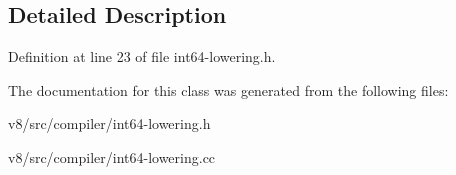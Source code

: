 \subsection{Detailed Description}


Definition at line 23 of file int64-\/lowering.\+h.



The documentation for this class was generated from the following files\+:\begin{DoxyCompactItemize}
\item 
v8/src/compiler/int64-\/lowering.\+h\item 
v8/src/compiler/int64-\/lowering.\+cc\end{DoxyCompactItemize}
